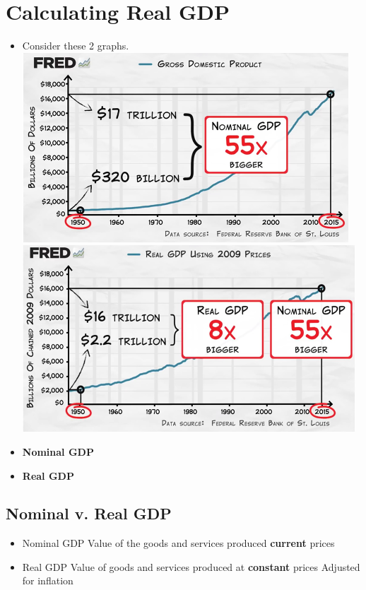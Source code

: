 \documentclass[12pt]{article} %
\begin{document}
\section{Calculating Real GDP}
\begin{itemize}
	\item Consider these 2 graphs. \\ \includegraphics[scale=1]{../images/Picture2.png} \\ \includegraphics[scale=1]{../images/Picture3.png} 
	\item \textbf{Nominal GDP}
	\item \textbf{Real GDP}
\end{itemize}

\subsection{Nominal v. Real GDP}
\begin{itemize}
\item Nominal GDP
\subitem Value of the goods and services produced \textbf{current} prices
\item Real GDP
	\subitem Value of goods and services produced at \textbf{constant} prices
		\subsubitem Adjusted for inflation
\end{itemize}
\end{document}
